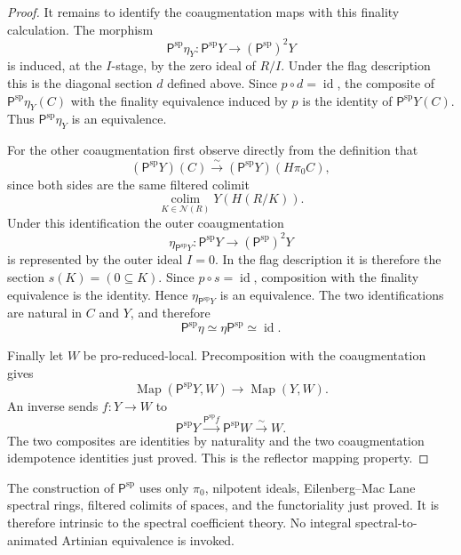 \begin{proof}
It remains to identify the coaugmentation maps with this finality
calculation.  The morphism
\[
    \mathsf P^{\mathrm{sp}}\eta_Y:
    \mathsf P^{\mathrm{sp}}Y
    \longrightarrow
    (\mathsf P^{\mathrm{sp}})^2Y
\]
is induced, at the $I$-stage, by the zero ideal of $R/I$.  Under the flag description this is the diagonal section $d$ defined above.
Since $p\circ d=\operatorname{id}$, the composite of
$\mathsf P^{\mathrm{sp}}\eta_Y(C)$ with the finality equivalence induced by
$p$ is the identity of $\mathsf P^{\mathrm{sp}}Y(C)$.  Thus
$\mathsf P^{\mathrm{sp}}\eta_Y$ is an equivalence.

For the other coaugmentation first observe directly from the definition that
\[
    (\mathsf P^{\mathrm{sp}}Y)(C)
    \xrightarrow{\sim}
    (\mathsf P^{\mathrm{sp}}Y)(H\pi_0C),
\]
since both sides are the same filtered colimit
\[
    \operatorname*{colim}_{K\in\mathcal N(R)}Y(H(R/K)).
\]
Under this identification the outer coaugmentation
\[
    \eta_{\mathsf P^{\mathrm{sp}}Y}:
    \mathsf P^{\mathrm{sp}}Y
    \longrightarrow
    (\mathsf P^{\mathrm{sp}})^2Y
\]
is represented by the outer ideal $I=0$.  In the flag description it is
therefore the section $s(K)=(0\subseteq K)$.  Since
$p\circ s=\operatorname{id}$, composition with the finality equivalence is the
identity.  Hence $\eta_{\mathsf P^{\mathrm{sp}}Y}$ is an equivalence.
The two identifications are natural in $C$ and $Y$, and therefore
\[
\boxed{
    \mathsf P^{\mathrm{sp}}\eta
    \simeq
    \eta\mathsf P^{\mathrm{sp}}
    \simeq
    \operatorname{id}.}
\]

Finally let $W$ be pro-reduced-local.  Precomposition with the coaugmentation
gives
\[
    \operatorname{Map}(\mathsf P^{\mathrm{sp}}Y,W)
    \longrightarrow
    \operatorname{Map}(Y,W).
\]
An inverse sends $f:Y\to W$ to
\[
    \mathsf P^{\mathrm{sp}}Y
    \xrightarrow{\mathsf P^{\mathrm{sp}}f}
    \mathsf P^{\mathrm{sp}}W
    \xrightarrow{\sim}
    W.
\]
The two composites are identities by naturality and the two coaugmentation
idempotence identities just proved.  This is the reflector mapping property.
\end{proof}

\begin{remark}
The construction of $\mathsf P^{\mathrm{sp}}$ uses only $\pi_0$, nilpotent
ideals, Eilenberg--Mac Lane spectral rings, filtered colimits of spaces, and
the functoriality just proved.  It is therefore intrinsic to the spectral
coefficient theory.  No integral spectral-to-animated Artinian equivalence is
invoked.
\end{remark}

